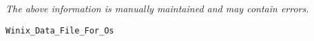 \label{pkg:winix\_data\_file\_for\_posix}

{\tiny \it The above information is manually maintained and may contain errors.}
\begin{verbatim}
Winix_Data_File_For_Os
\end{verbatim}
